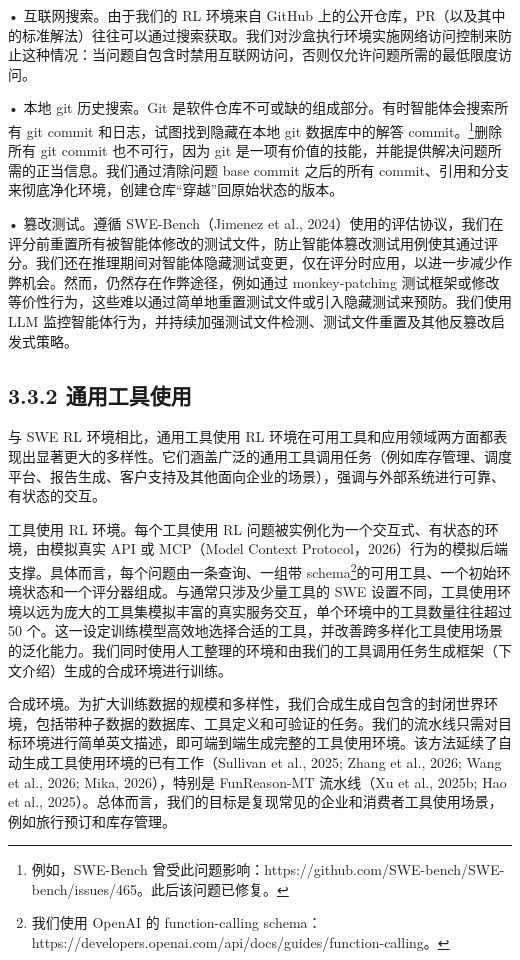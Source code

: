 • 互联网搜索。由于我们的 RL 环境来自 GitHub 上的公开仓库，PR（以及其中的标准解法）往往可以通过搜索获取。我们对沙盒执行环境实施网络访问控制来防止这种情况：当问题自包含时禁用互联网访问，否则仅允许问题所需的最低限度访问。

• 本地 git 历史搜索。Git 是软件仓库不可或缺的组成部分。有时智能体会搜索所有 git commit 和日志，试图找到隐藏在本地 git 数据库中的解答 commit。\footnote{例如，SWE-Bench 曾受此问题影响：https://github.com/SWE-bench/SWE-bench/issues/465。此后该问题已修复。}删除所有 git commit 也不可行，因为 git 是一项有价值的技能，并能提供解决问题所需的正当信息。我们通过清除问题 base commit 之后的所有 commit、引用和分支来彻底净化环境，创建仓库“穿越”回原始状态的版本。

• 篡改测试。遵循 SWE-Bench（Jimenez et al., 2024）使用的评估协议，我们在评分前重置所有被智能体修改的测试文件，防止智能体篡改测试用例使其通过评分。我们还在推理期间对智能体隐藏测试变更，仅在评分时应用，以进一步减少作弊机会。然而，仍然存在作弊途径，例如通过 monkey-patching 测试框架或修改等价性行为，这些难以通过简单地重置测试文件或引入隐藏测试来预防。我们使用 LLM 监控智能体行为，并持续加强测试文件检测、测试文件重置及其他反篡改启发式策略。

\subsection{3.3.2 通用工具使用}\label{general-tool-use}

与 SWE RL 环境相比，通用工具使用 RL 环境在可用工具和应用领域两方面都表现出显著更大的多样性。它们涵盖广泛的通用工具调用任务（例如库存管理、调度平台、报告生成、客户支持及其他面向企业的场景），强调与外部系统进行可靠、有状态的交互。

工具使用 RL 环境。每个工具使用 RL 问题被实例化为一个交互式、有状态的环境，由模拟真实 API 或 MCP（Model Context Protocol，2026）行为的模拟后端支撑。具体而言，每个问题由一条查询、一组带 schema\footnote{我们使用 OpenAI 的 function-calling schema：https://developers.openai.com/api/docs/guides/function-calling。}的可用工具、一个初始环境状态和一个评分器组成。与通常只涉及少量工具的 SWE 设置不同，工具使用环境以远为庞大的工具集模拟丰富的真实服务交互，单个环境中的工具数量往往超过 50 个。这一设定训练模型高效地选择合适的工具，并改善跨多样化工具使用场景的泛化能力。我们同时使用人工整理的环境和由我们的工具调用任务生成框架（下文介绍）生成的合成环境进行训练。

合成环境。为扩大训练数据的规模和多样性，我们合成生成自包含的封闭世界环境，包括带种子数据的数据库、工具定义和可验证的任务。我们的流水线只需对目标环境进行简单英文描述，即可端到端生成完整的工具使用环境。该方法延续了自动生成工具使用环境的已有工作（Sullivan et al., 2025; Zhang et al., 2026; Wang et al., 2026; Mika, 2026），特别是 FunReason-MT 流水线（Xu et al., 2025b; Hao et al., 2025）。总体而言，我们的目标是复现常见的企业和消费者工具使用场景，例如旅行预订和库存管理。

